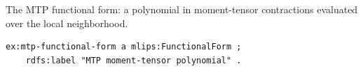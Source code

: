 The MTP functional form: a polynomial in moment-tensor contractions evaluated over the local neighborhood.
\begin{lstlisting}[language=turtle]
ex:mtp-functional-form a mlips:FunctionalForm ;
    rdfs:label "MTP moment-tensor polynomial" .
\end{lstlisting}
